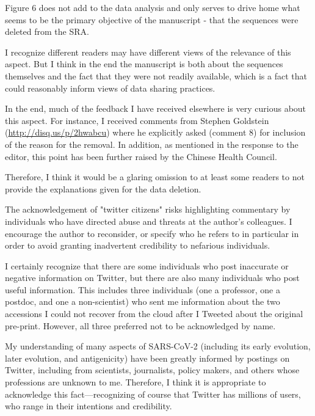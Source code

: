 \documentclass[11pt, oneside]{article}   	%
\newcommand{\response}[1]{{\color{black}#1}}
\begin{document}
Figure 6 does not add to the data analysis and only serves to drive home what seems to be the primary objective of the manuscript - that the sequences were deleted from the SRA.

\response{
I recognize different readers may have different views of the relevance of this aspect.
But I think in the end the manuscript is both about the sequences themselves and the fact that they were not readily available, which is a fact that could reasonably inform views of data sharing practices.

In the end, much of the feedback I have received elsewhere is very curious about this aspect.
For instance, I received comments from Stephen Goldstein (\url{http://disq.us/p/2hwabcu}) where he explicitly asked (comment 8) for inclusion of the reason for the removal.
In addition, as mentioned in the response to the editor, this point has been further raised by the Chinese Health Council.

Therefore, I think it would be a glaring omission to at least some readers to not provide the explanations given for the data deletion.
}

The acknowledgement of "twitter citizens" risks highlighting commentary by individuals who have directed abuse and threats at the author's colleagues. I encourage the author to reconsider, or specify who he refers to in particular in order to avoid granting inadvertent credibility to nefarious individuals.

\response{I certainly recognize that there are some individuals who post inaccurate or negative information on Twitter, but there are also many individuals who post useful information.
This includes three individuals (one a professor, one a postdoc, and one a non-scientist) who sent me information about the two accessions I could not recover from the cloud after I Tweeted about the original pre-print.
However, all three preferred not to be acknowledged by name.

My understanding of many aspects of SARS-CoV-2 (including its early evolution, later evolution, and antigenicity) have been greatly informed by postings on Twitter, including from scientists, journalists, policy makers, and others whose professions are unknown to me.
Therefore, I think it is appropriate to acknowledge this fact---recognizing of course that Twitter has millions of users, who range in their intentions and credibility.
}

\color{black}

{\small

}
\end{document}
